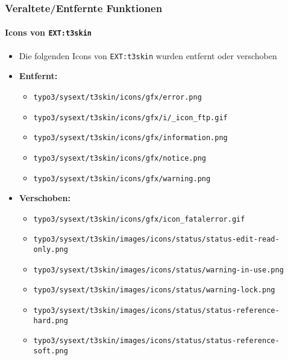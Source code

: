 
\begin{frame}[fragile]
	\frametitle{Veraltete/Entfernte Funktionen}
	\framesubtitle{Icons von \texttt{EXT:t3skin}}

	\begin{itemize}

		\item Die folgenden Icons von \texttt{EXT:t3skin} wurden entfernt oder verschoben
		\item \textbf{Entfernt:}

			\begin{itemize}
				\item \smaller\texttt{typo3/sysext/t3skin/icons/gfx/error.png}
				\item \texttt{typo3/sysext/t3skin/icons/gfx/i/\_icon\_ftp.gif}
				\item \texttt{typo3/sysext/t3skin/icons/gfx/information.png}
				\item \texttt{typo3/sysext/t3skin/icons/gfx/notice.png}
				\item \texttt{typo3/sysext/t3skin/icons/gfx/warning.png}
			\end{itemize}

		\item \textbf{Verschoben:}

			\begin{itemize}
				\item \smaller\texttt{typo3/sysext/t3skin/icons/gfx/icon\_fatalerror.gif}
				\item \texttt{typo3/sysext/t3skin/images/icons/status/status-edit-read-only.png}
				\item \texttt{typo3/sysext/t3skin/images/icons/status/warning-in-use.png}
				\item \texttt{typo3/sysext/t3skin/images/icons/status/warning-lock.png}
				\item \texttt{typo3/sysext/t3skin/images/icons/status/status-reference-hard.png}
				\item \texttt{typo3/sysext/t3skin/images/icons/status/status-reference-soft.png}
			\end{itemize}

	\end{itemize}

\end{frame}

